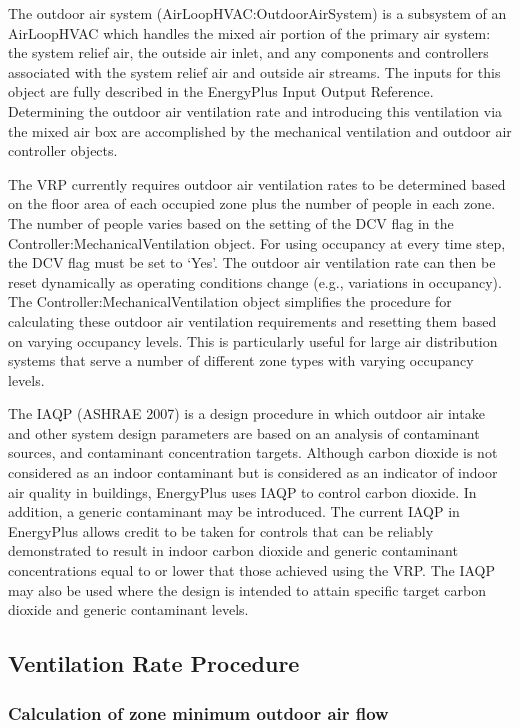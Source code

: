 The outdoor air system (AirLoopHVAC:OutdoorAirSystem) is a subsystem of an AirLoopHVAC which handles the mixed air portion of the primary air system: the system relief air, the outside air inlet, and any components and controllers associated with the system relief air and outside air streams. The inputs for this object are fully described in the EnergyPlus Input Output Reference. Determining the outdoor air ventilation rate and introducing this ventilation via the mixed air box are accomplished by the mechanical ventilation and outdoor air controller objects.

The VRP currently requires outdoor air ventilation rates to be determined based on the floor area of each occupied zone plus the number of people in each zone. The number of people varies based on the setting of the DCV flag in the Controller:MechanicalVentilation object. For using occupancy at every time step, the DCV flag must be set to `Yes'. The outdoor air ventilation rate can then be reset dynamically as operating conditions change (e.g., variations in occupancy). The Controller:MechanicalVentilation object simplifies the procedure for calculating these outdoor air ventilation requirements and resetting them based on varying occupancy levels. This is particularly useful for large air distribution systems that serve a number of different zone types with varying occupancy levels.

The IAQP (ASHRAE 2007) is a design procedure in which outdoor air intake and other system design parameters are based on an analysis of contaminant sources, and contaminant concentration targets. Although carbon dioxide is not considered as an indoor contaminant but is considered as an indicator of indoor air quality in buildings, EnergyPlus uses IAQP to control carbon dioxide. In addition, a generic contaminant may be introduced. The current IAQP in EnergyPlus allows credit to be taken for controls that can be reliably demonstrated to result in indoor carbon dioxide and generic contaminant concentrations equal to or lower that those achieved using the VRP. The IAQP may also be used where the design is intended to attain specific target carbon dioxide and generic contaminant levels.

\subsection{Ventilation Rate Procedure}\label{ventilation-rate-procedure}

\subsubsection{Calculation of zone minimum outdoor air flow}\label{calculation-of-zone-minimum-outdoor-air-flow}

